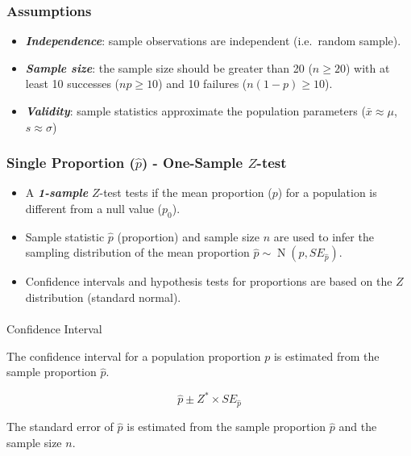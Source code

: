 \documentclass[
  letterpaper,
  DIV=11,
  numbers=noendperiod]{scrartcl}
\makeatletter
\let\oldparagraph\paragraph
\renewcommand{\paragraph}{
    \@ifstar
      \xxxParagraphStar
      \xxxParagraphNoStar
  }
\newcommand{\xxxParagraphStar}[1]{\oldparagraph*{#1}\mbox{}}
\newcommand{\xxxParagraphNoStar}[1]{\oldparagraph{#1}\mbox{}}
\makeatother
\begin{document}
\subsubsection{Assumptions}\label{assumptions-1}

\begin{itemize}
\item
  \textbf{\emph{Independence}}: sample observations are independent
  (i.e.~random sample).
\item
  \textbf{\emph{Sample size}}: the sample size should be greater than 20
  (\(n \ge 20\)) with at least 10 successes (\(np \ge 10\)) and 10
  failures (\(n(1-p) \ge 10\)).
\item
  \textbf{\emph{Validity}}: sample statistics approximate the population
  parameters (\(\bar{x} \approx \mu\), \(s \approx \sigma\))
\end{itemize}

\subsubsection{\texorpdfstring{Single Proportion (\(\hat{p}\)) -
One-Sample
\(Z\)-test}{Single Proportion (\textbackslash hat\{p\}) - One-Sample Z-test}}\label{single-proportion-hatp---one-sample-z-test}

\begin{itemize}
\item
  A \textbf{\emph{1-sample}} \(Z\)-test tests if the mean proportion
  (\(p\)) for a population is different from a null value (\(p_0\)).
\item
  Sample statistic \(\hat{p}\) (proportion) and sample size \(n\) are
  used to infer the sampling distribution of the mean proportion
  \(\hat{p} \sim \operatorname{N}\left(p, SE_{\hat{p}}\right)\).
\item
  Confidence intervals and hypothesis tests for proportions are based on
  the \(Z\) distribution (standard normal).
\end{itemize}

\paragraph{Confidence Interval}\label{confidence-interval-3}

The confidence interval for a population proportion \(p\) is estimated
from the sample proportion \(\hat{p}\).

\[
\hat{p} \pm Z^* \times SE_{\hat{p}}
\]

The standard error of \(\hat{p}\) is estimated from the sample
proportion \(\hat{p}\) and the sample size \(n\).
\end{document}
